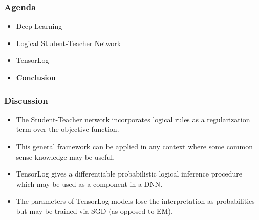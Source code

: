 \documentclass{beamer}
\begin{document}
\begin{frame}
\frametitle{Agenda}
\begin{itemize}
	\item Deep Learning
	\item Logical Student-Teacher Network
	\item TensorLog
	\item \textbf{Conclusion}
\end{itemize}
\end{frame}

\begin{frame}[fragile]
\frametitle{Discussion}
\begin{itemize}
	\item The Student-Teacher network incorporates logical rules as a regularization term over the objective function.
	\item This general framework can be applied in any context where some common sense knowledge may be useful.
	\item TensorLog gives a differentiable probabilistic logical inference procedure which may be used as a component in a DNN.
	\item The parameters of TensorLog models lose the interpretation as probabilities but may be trained via SGD (as opposed to EM).
\end{itemize}
\end{frame}
\end{document}
